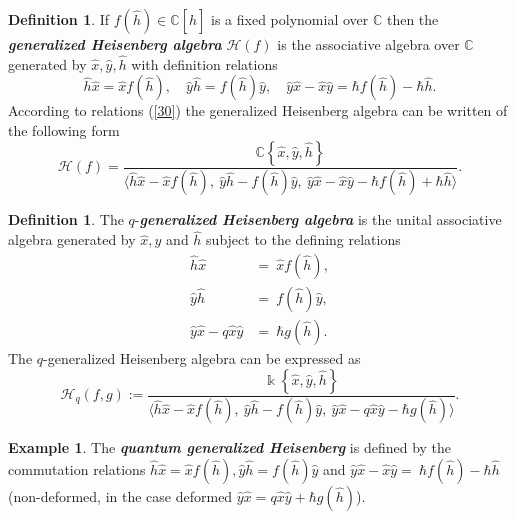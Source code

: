 \documentclass[12pt,a4paper]{article}
\theoremstyle{plain}
\theoremstyle{definition}
\newtheorem{definition}[theorem]{Definition}
\newtheorem{example}[theorem]{Example}
\theoremstyle{remark}
\begin{document}
\begin{definition}\cite{OuyangLiuXiang2015}
If $f(\hat{h})\in\mathbb{C}[\hat{h}]$ is a fixed polynomial over $\mathbb{C}$ then the \textit{\textbf{generalized Heisenberg algebra}} $\mathcal{H}(f)$ is the associative algebra over $\mathbb{C}$  generated by $\hat{x}, \hat{y}, \hat{h}$ with definition relations
\begin{equation}\label{30}
    \hat{h}\hat{x} = \hat{x}f(\hat{h}), \quad \hat{y}\hat{h} = f(\hat{h})\hat{y}, \quad \hat{y}\hat{x}-\hat{x}\hat{y} = \hbar f(\hat{h})-\hbar\hat{h}.
\end{equation}
    According to relations (\ref{30}) the generalized Heisenberg algebra can be written of the following form
    \begin{equation*}
        \mathcal{H}(f)=\frac{\mathbb{C}\left\{ \hat{x}, \hat{y}, \hat{h} \right\}}{\langle \hat{h}\hat{x} - \hat{x}f(\hat{h}), \ \hat{y}\hat{h} - f(\hat{h}) \hat{y}, \ \hat{y} \hat{x} - \hat{x} \hat{y}-\hbar f(\hat{h})+\hbar\hat{h}\rangle}.
    \end{equation*}
\end{definition}
\begin{definition}\cite{Razavinia-Lopes2020} The $q$-\textit{\textbf{generalized Heisenberg algebra}} is the unital associative algebra generated by $\hat{x}, \hat{y}$ and $\hat{h}$ subject to the defining relations
\begin{align}\label{31lr}
 \hat{h}\hat{x} & = \ \hat{x}f(\hat{h}), \\
 \label{32lr}\hat{y}\hat{h}  & = \ f(\hat{h})\hat{y},\\ 
 \label{33lr}\hat{y}\hat{x}-q\hat{x}\hat{y} &  = \ \hbar g(\hat{h}).
\end{align}
    The $q$-generalized Heisenberg algebra can be expressed as \begin{equation*}
        \mathcal{H}_{q}(f,g):=\frac{\Bbbk\left\{ \hat{x}, \hat{y}, \hat{h} \right\}}{\langle \hat{h}\hat{x} - \hat{x}f(\hat{h}), \ \hat{y}\hat{h} - f(\hat{h}) \hat{y}, \ \hat{y} \hat{x} - q\hat{x} \hat{y}-\hbar g(\hat{h})\rangle}.
    \end{equation*}
\end{definition}
\begin{example}\cite{Razavinia-Lopes2020}
 The {\em \textbf{quantum generalized Heisenberg}} is defined by the commutation relations $\hat{h}\hat{x}=\hat{x}f(\hat{h}), \hat{y}\hat{h}=f(\hat{h})\hat{y}$ and $\hat{y}\hat{x}-\hat{x}\hat{y}=\ \hbar f(\hat{h})-\hbar\hat{h}$ (non-deformed, in the case deformed $\hat{y}\hat{x}=q\hat{x}\hat{y}+\hbar g(\hat{h})$).
\end{example}
\end{document}
